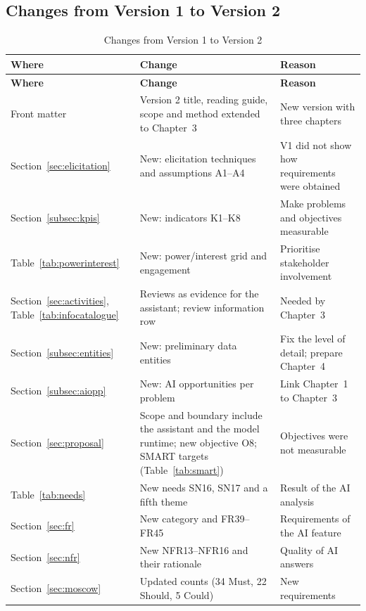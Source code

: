 \documentclass[11pt,a4paper,oneside]{extreport}
\newif\ifshowvtwo
\newcommand{\vtwocolor}{\ifshowvtwo\color{red}\fi}
\newcommand{\upd}[1]{\ifshowvtwo\textcolor{red}{#1}\else#1\fi}
\newenvironment{updated}{\par\vtwocolor}{\par}
\begin{document}
\subsection*{\upd{Changes from Version 1 to Version 2}}
\begin{updated}
{\small
\begin{xltabular}{\textwidth}{@{}L{3.2cm} Y L{3.6cm}@{}}
\caption{Changes from Version 1 to Version 2}\label{tab:v2changes}\\
\toprule
\textbf{Where} & \textbf{Change} & \textbf{Reason} \\ \midrule
\endfirsthead
\toprule
\textbf{Where} & \textbf{Change} & \textbf{Reason} \\ \midrule
\endhead
\bottomrule
\endlastfoot
Front matter & Version 2 title, reading guide, scope and method extended to Chapter~3 & New version with three chapters \\
Section~\ref{sec:elicitation} & New: elicitation techniques and assumptions A1--A4 & V1 did not show how requirements were obtained \\
Section~\ref{subsec:kpis} & New: indicators K1--K8 & Make problems and objectives measurable \\
Table~\ref{tab:powerinterest} & New: power/interest grid and engagement & Prioritise stakeholder involvement \\
Section~\ref{sec:activities}, Table~\ref{tab:infocatalogue} & Reviews as evidence for the assistant; review information row & Needed by Chapter~3 \\
Section~\ref{subsec:entities} & New: preliminary data entities & Fix the level of detail; prepare Chapter~4 \\
Section~\ref{subsec:aiopp} & New: AI opportunities per problem & Link Chapter~1 to Chapter~3 \\
Section~\ref{sec:proposal} & Scope and boundary include the assistant and the model runtime; new objective O8; SMART targets (Table~\ref{tab:smart}) & Objectives were not measurable \\
Table~\ref{tab:needs} & New needs SN16, SN17 and a fifth theme & Result of the AI analysis \\
Section~\ref{sec:fr} & New category and FR39--FR45 & Requirements of the AI feature \\
Section~\ref{sec:nfr} & New NFR13--NFR16 and their rationale & Quality of AI answers \\
Section~\ref{sec:moscow} & Updated counts (34 Must, 22 Should, 5 Could) & New requirements \\

\end{xltabular}}
\end{updated}
\end{document}
